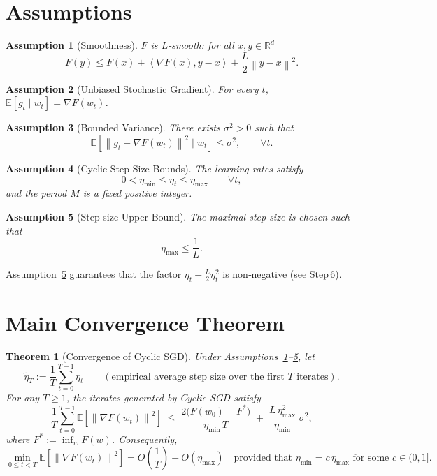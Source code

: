\documentclass{article}
\newtheorem{theorem}{Theorem}
\newtheorem{assumption}{Assumption}
\newcommand{\E}{\mathbb{E}}
\newcommand{\R}{\mathbb{R}}
\newcommand{\norm}[1]{\left\|#1\right\|}
\newcommand{\inner}[2]{\left\langle #1,#2\right\rangle}
\begin{document}
\section*{Assumptions}
\begin{assumption}[Smoothness]\label{as:smooth}
$F$ is $L$‑smooth: for all $x,y\in\R^{d}$
\[
F(y)\le F(x)+\inner{\nabla F(x)}{y-x}+\frac{L}{2}\norm{y-x}^{2}.
\]
\end{assumption}
\begin{assumption}[Unbiased Stochastic Gradient]\label{as:unbiased}
For every $t$, $\E[g_{t}\mid w_{t}]=\nabla F(w_{t})$.
\end{assumption}
\begin{assumption}[Bounded Variance]\label{as:variance}
There exists $\sigma^{2}>0$ such that
\[
\E\!\left[\norm{g_{t}-\nabla F(w_{t})}^{2}\mid w_{t}\right]\le\sigma^{2},
\qquad\forall t.
\]
\end{assumption}
\begin{assumption}[Cyclic Step‑Size Bounds]\label{as:step}
The learning rates satisfy
\[
0<\eta_{\min}\le\eta_{t}\le\eta_{\max}\qquad\forall t,
\]
and the period $M$ is a fixed positive integer.
\end{assumption}
\begin{assumption}[Step‑size Upper‑Bound]\label{as:stepmax}
The maximal step size is chosen such that
\[
\eta_{\max}\le\frac{1}{L}.
\]
\end{assumption}
Assumption~\ref{as:stepmax} guarantees that the factor
$\eta_{t}-\frac{L}{2}\eta_{t}^{2}$ is non‑negative (see Step 6).

\section*{Main Convergence Theorem}
\begin{theorem}[Convergence of Cyclic SGD]\label{thm:main}
Under Assumptions~\ref{as:smooth}–\ref{as:stepmax}, let
\[
\tilde\eta_T:=\frac{1}{T}\sum_{t=0}^{T-1}\eta_{t}
\qquad(\text{empirical average step size over the first $T$ iterates}).
\]
For any $T\ge1$, the iterates generated by Cyclic SGD satisfy
\begin{equation}\label{eq:bound}
\frac{1}{T}\sum_{t=0}^{T-1}\E\!\left[\norm{\nabla F(w_{t})}^{2}\right]
\;\le\;
\frac{2\big(F(w_{0})-F^{*}\big)}{\eta_{\min}\,T}
\;+\;
\frac{L\,\eta_{\max}^{2}}{\eta_{\min}}\;\sigma^{2},
\end{equation}
where $F^{*}:=\inf_{w}F(w)$.  Consequently,
\[
\min_{0\le t<T}\E\!\left[\norm{\nabla F(w_{t})}^{2}\right]
=O\!\left(\frac{1}{T}\right)+O\!\left(\eta_{\max}\right)
\quad\text{provided that }\eta_{\min}=c\,\eta_{\max}\text{ for some }c\in(0,1].
\]
\end{theorem}
\end{document}
